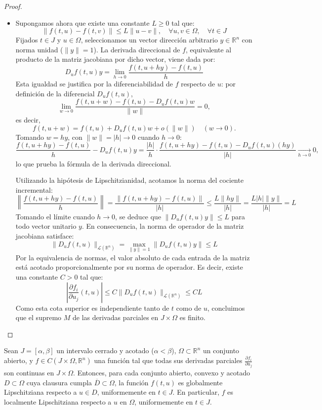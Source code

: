 \begin{proof}
\begin{itemize}
        \item[$\Rightarrow$] Supongamos ahora que existe una constante $L \geq 0$ tal que:
        \[
            \|f(t,u) - f(t,v)\| \leq L \|u - v\|, \quad \forall u, v \in \Omega, \quad \forall t \in J
        \]
        Fijados $t \in J$ y $u \in \Omega$, seleccionamos un vector dirección arbitrario $y \in \mathbb{R}^n$ con norma unidad ($\|y\|=1$). La derivada direccional de $f$, equivalente al producto de la matriz jacobiana por dicho vector, viene dada por:
        \[
            D_u f(t,u) y = \lim_{h \to 0} \frac{f(t, u+hy) - f(t,u)}{h}
        \]
        Esta igualdad se justifica por la diferenciabilidad de $f$ respecto de $u$: por definición de la diferencial $D_u f(t,u)$,
        \[
            \lim_{w \to 0} \frac{f(t, u+w) - f(t,u) - D_u f(t,u) w}{\|w\|} = 0,
        \]
        es decir,
        \[
            f(t, u+w) = f(t,u) + D_u f(t,u) w + o(\|w\|) \quad (w \to 0).
        \]
        Tomando $w = hy$, con $\|w\| = |h| \to 0$ cuando $h \to 0$:
        \[
            \frac{f(t, u+hy) - f(t,u)}{h} - D_u f(t,u) y = \frac{|h|}{h} \cdot \frac{f(t, u+hy) - f(t,u) - D_u f(t,u)(hy)}{|h|} \xrightarrow[h \to 0]{} 0,
        \]
        lo que prueba la fórmula de la derivada direccional.

        Utilizando la hipótesis de Lipschitzianidad, acotamos la norma del cociente incremental:
        \[
            \left\| \frac{f(t, u+hy) - f(t,u)}{h} \right\| = \frac{\|f(t, u+hy) - f(t,u)\|}{|h|} \leq \frac{L \|hy\|}{|h|} = \frac{L |h| \|y\|}{|h|} = L
        \]
        Tomando el límite cuando $h \to 0$, se deduce que $\|D_u f(t,u) y\| \leq L$ para todo vector unitario $y$. En consecuencia, la norma de operador de la matriz jacobiana satisface:
        \[
            \|D_u f(t,u)\|_{\mathcal{L}(\mathbb{R}^n)} = \max_{\|y\|=1} \|D_u f(t,u) y\| \leq L
        \]
        Por la equivalencia de normas, el valor absoluto de cada entrada de la matriz está acotado proporcionalmente por su norma de operador. Es decir, existe una constante $C > 0$ tal que:
        \[
            \left| \frac{\partial f_i}{\partial u_j} (t,u) \right| \leq C \|D_u f(t,u)\|_{\mathcal{L}(\mathbb{R}^n)} \leq C L
        \]
        Como esta cota superior es independiente tanto de $t$ como de $u$, concluimos que el supremo $M$ de las derivadas parciales en $J \times \Omega$ es finito.
    \end{itemize}
\end{proof}

\begin{corolario}
    Sean $J = [\alpha, \beta]$ un intervalo cerrado y acotado ($\alpha < \beta$), $\Omega \subset \mathbb{R}^n$ un conjunto abierto, y $f \in C(J \times \Omega, \mathbb{R}^n)$ una función tal que todas sus derivadas parciales $\frac{\partial f_i}{\partial u_j}$ son continuas en $J \times \Omega$. Entonces, para cada conjunto abierto, convexo y acotado $D \subset \Omega$ cuya clausura cumpla $\overline{D} \subset \Omega$, la función $f(t,u)$ es globalmente Lipschitziana respecto a $u \in D$, uniformemente en $t \in J$. En particular, $f$ es localmente Lipschitziana respecto a $u$ en $\Omega$, uniformemente en $t \in J$. 
\end{corolario}

